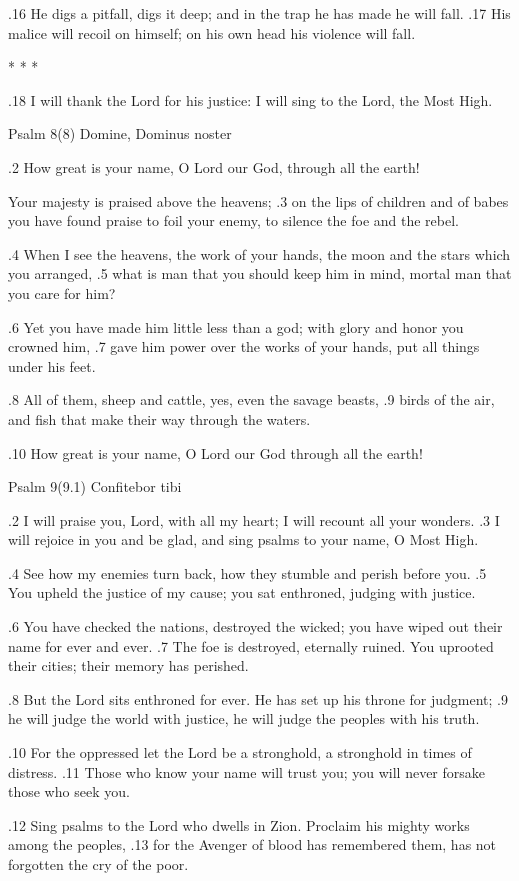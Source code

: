 .16 He digs a pitfall, digs it deep;
and in the trap he has made he will fall.
.17 His malice will recoil on himself;
on his own head his violence will fall.

* * *

.18 I will thank the Lord for his justice:
I will sing to the Lord, the Most High.


Psalm 8(8) Domine, Dominus noster

.2 How great is your name, O Lord our God,
through all the earth!

Your majesty is praised above the heavens;
.3 on the lips of children and of babes
you have found praise to foil your enemy,
to silence the foe and the rebel.

.4 When I see the heavens, the work of your hands,
the moon and the stars which you arranged,
.5 what is man that you should keep him in mind,
mortal man that you care for him?

.6 Yet you have made him little less than a god;
with glory and honor you crowned him,
.7 gave him power over the works of your hands,
put all things under his feet.

.8 All of them, sheep and cattle,
yes, even the savage beasts,
.9 birds of the air, and fish
that make their way through the waters.

.10 How great is your name, O Lord our God
through all the earth!


Psalm 9(9.1) Confitebor tibi

.2 I will praise you, Lord, with all my heart;
I will recount all your wonders.
.3 I will rejoice in you and be glad,
and sing psalms to your name, O Most High.

.4 See how my enemies turn back,
how they stumble and perish before you.
.5 You upheld the justice of my cause;
you sat enthroned, judging with justice.

.6 You have checked the nations, destroyed the wicked;
you have wiped out their name for ever and ever.
.7 The foe is destroyed, eternally ruined.
You uprooted their cities; their memory has perished.

.8 But the Lord sits enthroned for ever.
He has set up his throne for judgment;
.9 he will judge the world with justice,
he will judge the peoples with his truth.

.10 For the oppressed let the Lord be a stronghold,
a stronghold in times of distress.
.11 Those who know your name will trust you;
you will never forsake those who seek you.

.12 Sing psalms to the Lord who dwells in Zion.
Proclaim his mighty works among the peoples,
.13 for the Avenger of blood has remembered them,
has not forgotten the cry of the poor.

